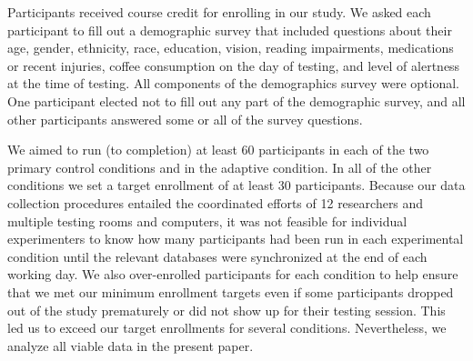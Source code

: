 \documentclass[11pt]{article}
\begin{document}
Participants received course credit for enrolling in our study. We asked each
participant to fill out a demographic survey that included questions about
their age, gender, ethnicity, race, education, vision, reading
impairments, medications or recent injuries, coffee consumption on the day of
testing, and level of alertness at the time of testing. All components of the
demographics survey were optional. One participant elected not to fill out any
part of the demographic survey, and all other participants answered some or all
of the survey questions.

We aimed to run (to completion) at least 60 participants in each of the two
primary control conditions and in the adaptive condition. In all of the other
conditions we set a target enrollment of at least 30 participants. Because our
data collection procedures entailed the coordinated efforts of 12 researchers
and multiple testing rooms and computers, it was not feasible for individual
experimenters to know how many participants had been run in each experimental
condition until the relevant databases were synchronized at the end of each
working day. We also over-enrolled participants for each condition to help
ensure that we met our minimum enrollment targets even if some participants
dropped out of the study prematurely or did not show up for their testing
session. This led us to exceed our target enrollments for several conditions.
Nevertheless, we analyze all viable data in the present paper.
\end{document}
